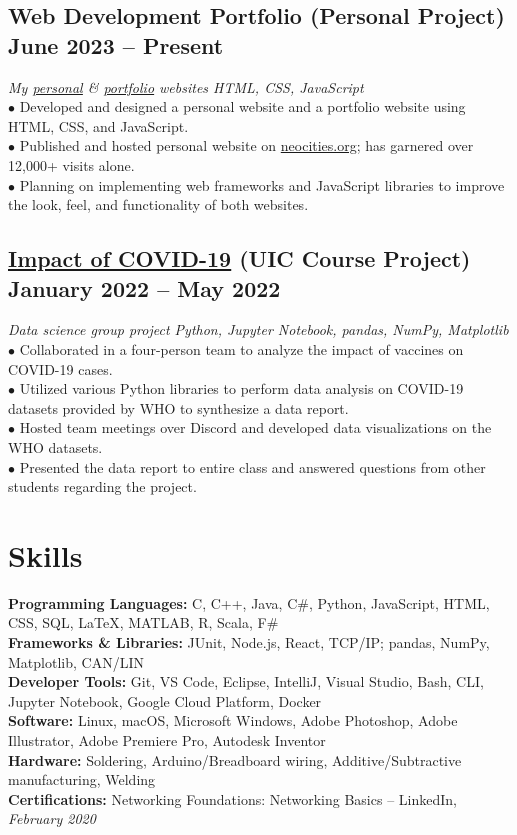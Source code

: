 \documentclass{article}
\begin{document}
\subsection{Web Development Portfolio (Personal Project) \hfill \textnormal{June 2023 -- Present}}
\vspace{-0.5em}
\textit{My \href{https://github.com/IanLulu/neocities-website}{\underline{personal}} \& \href{https://github.com/IanLulu/ianlulu.github.io}{\underline{portfolio}} websites \hfill HTML, CSS, JavaScript}
\\
$\bullet$ Developed and designed a personal website and a portfolio website using HTML, CSS, and JavaScript.
\\
$\bullet$ Published and hosted personal website on \url{neocities.org}; has garnered over 12,000+ visits alone.
\\
$\bullet$ Planning on implementing web frameworks and JavaScript libraries to improve the look, feel, and functionality of both websites.
\vspace{-0.5em}

\subsection{\href{https://github.com/uic-cs418/cs418-spring22-the-wild-card}{\underline{Impact of COVID-19}} (UIC Course Project) \hfill \textnormal{January 2022 -- May 2022}}
\vspace{-0.5em}
\textit{Data science group project \hfill Python, Jupyter Notebook, pandas, NumPy, Matplotlib}
\\
$\bullet$ Collaborated in a four-person team to analyze the impact of vaccines on COVID-19 cases.
\\
$\bullet$ Utilized various Python libraries to perform data analysis on COVID-19 datasets provided by WHO to synthesize a data report.
\\
$\bullet$ Hosted team meetings over Discord and developed data visualizations on the WHO datasets.
\\
$\bullet$ Presented the data report to entire class and answered questions from other students regarding the project.


\section{Skills}
\textbf{Programming Languages:} C, C++, Java, C\#, Python, JavaScript, HTML, CSS, SQL, {\LaTeX}, MATLAB, R, Scala, F\#
\\
\textbf{Frameworks \& Libraries:} JUnit, Node.js, React, TCP/IP; pandas, NumPy, Matplotlib, CAN/LIN
\\
\textbf{Developer Tools:} Git, VS Code, Eclipse, IntelliJ, Visual Studio, Bash, CLI, Jupyter Notebook, Google Cloud Platform, Docker
\\
\textbf{Software:} Linux, macOS, Microsoft Windows, Adobe Photoshop, Adobe Illustrator, Adobe Premiere Pro, Autodesk Inventor
\\
\textbf{Hardware:} Soldering, Arduino/Breadboard wiring, Additive/Subtractive manufacturing, Welding
\\
\textbf{Certifications:} Networking Foundations: Networking Basics -- LinkedIn, \textit{February 2020}
\end{document}
